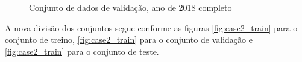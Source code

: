 {\begin{center}
\begin{minipage}[b]{0.45\textwidth}
\begin{figure}[H]
{                  \caption{Conjunto de dados de validação, ano de 2018 completo} \label{fig:case2_val} }
                \end{figure}
                \end{minipage}
                 \begin{minipage}[b]{0.45\textwidth}
                \begin{figure}[H]
                \end{figure}
                \end{minipage} \end{center} }
    	        
    	        A nova divisão dos conjuntos segue conforme as figuras \ref{fig:case2_train} para o conjunto de treino, \ref{fig:case2_train} para o conjunto de validação e \ref{fig:case2_train} para o conjunto de teste.
    	   
